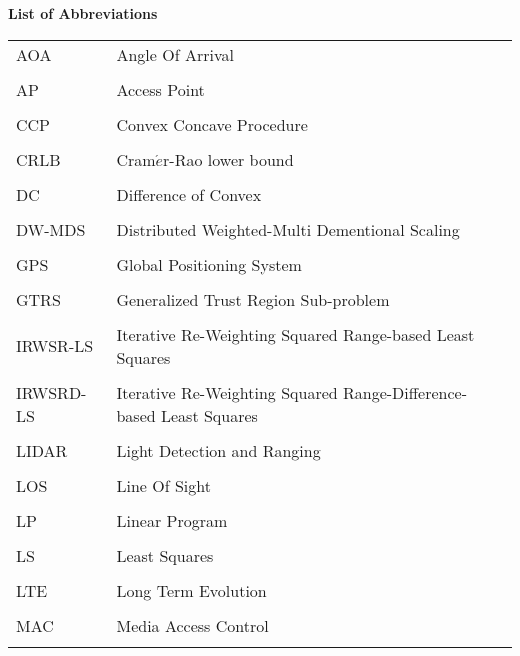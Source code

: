 \newpage


\phantom{m}

\begin{flushleft}
\begin{Huge}
\textbf{List of Abbreviations}
\end{Huge}
\end{flushleft}

\phantom{m}

\begin{longtable}[h]{l l}

AOA & Angle Of Arrival\\
\\
AP & Access Point \\
\\
CCP & Convex Concave Procedure \\
\\
CRLB & Cram$\acute{e}$r-Rao  lower  bound \\
\\
DC & Difference of Convex \\
\\
DW-MDS & Distributed Weighted-Multi Dementional Scaling \\
\\
GPS & Global Positioning System \\
\\
GTRS & Generalized Trust Region Sub-problem \\
\\
IRWSR-LS & Iterative Re-Weighting Squared Range-based Least Squares \\
\\
IRWSRD-LS & Iterative Re-Weighting Squared Range-Difference-based Least Squares\\
\\
LIDAR & Light Detection and Ranging\\
\\
LOS & Line Of Sight \\
\\
LP & Linear Program \\
\\
LS & Least Squares \\
\\
LTE & Long Term Evolution \\
\\
MAC & Media Access Control\\
\\

\end{longtable}
